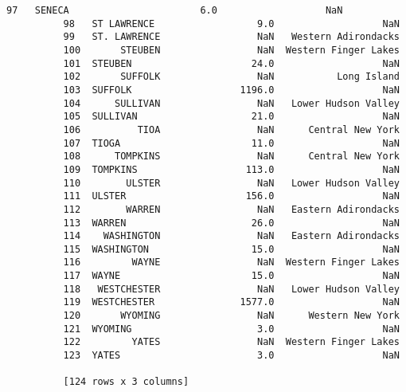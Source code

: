 \documentclass[11pt]{article}
\begin{document}
\begin{Verbatim}[commandchars=\\\{\}]
          97   SENECA                       6.0                   NaN
          98   ST LAWRENCE                  9.0                   NaN
          99   ST. LAWRENCE                 NaN   Western Adirondacks
          100       STEUBEN                 NaN  Western Finger Lakes
          101  STEUBEN                     24.0                   NaN
          102       SUFFOLK                 NaN           Long Island
          103  SUFFOLK                   1196.0                   NaN
          104      SULLIVAN                 NaN   Lower Hudson Valley
          105  SULLIVAN                    21.0                   NaN
          106          TIOA                 NaN      Central New York
          107  TIOGA                       11.0                   NaN
          108      TOMPKINS                 NaN      Central New York
          109  TOMPKINS                   113.0                   NaN
          110        ULSTER                 NaN   Lower Hudson Valley
          111  ULSTER                     156.0                   NaN
          112        WARREN                 NaN   Eastern Adirondacks
          113  WARREN                      26.0                   NaN
          114    WASHINGTON                 NaN   Eastern Adirondacks
          115  WASHINGTON                  15.0                   NaN
          116         WAYNE                 NaN  Western Finger Lakes
          117  WAYNE                       15.0                   NaN
          118   WESTCHESTER                 NaN   Lower Hudson Valley
          119  WESTCHESTER               1577.0                   NaN
          120       WYOMING                 NaN      Western New York
          121  WYOMING                      3.0                   NaN
          122         YATES                 NaN  Western Finger Lakes
          123  YATES                        3.0                   NaN
          
          [124 rows x 3 columns]
\end{Verbatim}
            
\end{document}

